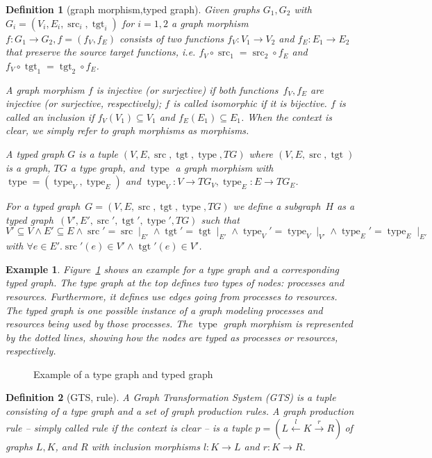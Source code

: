 \documentclass{tlp}
\newtheorem{example}{Example}[section]
\newtheorem{definition}{Definition}[section]
\DeclareMathOperator{\type}{type}
\DeclareMathOperator{\src}{src}
\DeclareMathOperator{\tgt}{tgt}
\newcommand{\prodrule}{\ensuremath{p = (L \stackrel{l}{\leftarrow} K
\stackrel{r}{\rightarrow} R)\ }}
\begin{document}
\begin{definition}[graph morphism,typed graph] 
Given graphs $G_1, G_2$ with $G_i = (V_i,E_i,\src_i,\tgt_i)$ for $i=1,2$ a
\emph{graph morphism} $f: G_1 \rightarrow G_2, f = (f_V,f_E)$ consists of two
functions $f_V: V_1 \rightarrow V_2$ and $f_E : E_1 \rightarrow E_2$ that
preserve the source target functions, i.e. $f_V \circ \src_1 = \src_2 \circ
f_E$ and $f_V \circ \tgt_1 = \tgt_2 \circ f_E$.

A graph morphism $f$ is \emph{injective} (or \emph{surjective}) if both
functions~$f_V,f_E$ are injective (or surjective, respectively); $f$ is called
\emph{isomorphic} if it is bijective. $f$ is called an \emph{inclusion} if
$f_V(V_1) \subseteq V_1$ and $f_E(E_1) \subseteq E_1$. When the context is
clear, we simply refer to graph morphisms as morphisms.

A \emph{typed graph} $G$ is a tuple $(V, E, \src, \tgt, \type, TG)$ where $(V, E,
\src, \tgt)$ is a graph, $TG$ a type graph, and $\type$ a graph morphism with
$\type = (\type_V, \type_E)$ and $\type_V : V \rightarrow TG_V, \type_E : E
\rightarrow TG_E$.

For a typed graph~$G = (V, E, \src, \tgt, \type, TG)$ we define a
\emph{subgraph}~$H$ as a typed graph~$(V',E',\src',\tgt',\type',TG)$ such that
$V' \subseteq V \land E' \subseteq E \land \src' = \src \mid_{E'} \land \tgt' =
\tgt \mid_{E'} \land \type_V' = \type_V \mid_{V'} \land \type_E' = \type_E
\mid_{E'}$ with $\forall e \in E' . \src'(e) \in V' \land \tgt'(e) \in V'$.
\end{definition}

\begin{example}Figure~\ref{fig:type} shows an example for a type graph and a
corresponding typed graph. The type graph at the top defines two types of nodes:
processes and resources. Furthermore, it defines \emph{use} edges going from
processes to resources. The typed graph is one possible instance of a graph
modeling processes and resources being used by those processes. The $\type$
graph morphism is represented by the dotted lines, showing how the nodes are
typed as processes or resources, respectively.
\end{example}

\begin{figure}
\centerline{
}
\caption{Example of a type graph and typed graph}
\label{fig:type}
\end{figure}

\begin{definition}[GTS, rule] A \emph{Graph Transformation System} (GTS) is a
tuple consisting of a type graph and a set of graph production rules. A
\emph{graph production rule} -- simply called \emph{rule} if the context is clear
-- is a tuple \prodrule of graphs $L,K$, and $R$ with inclusion morphisms $l:K
\rightarrow L$ and $r:K \rightarrow R$.
\end{definition}
\end{document}

